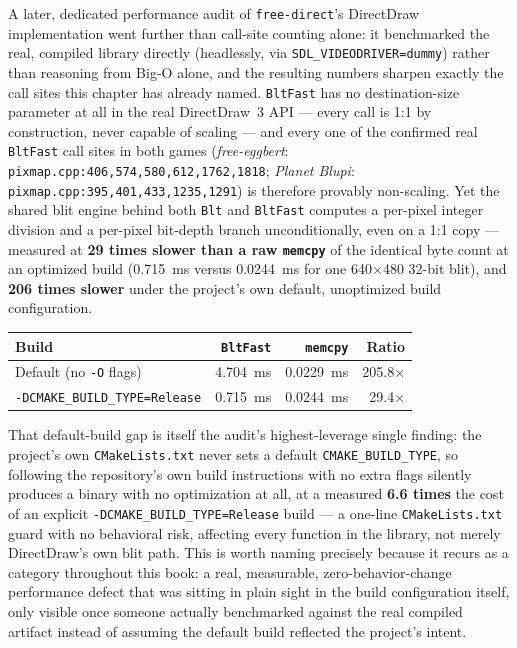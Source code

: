 A later, dedicated performance audit of \texttt{free-direct}'s DirectDraw implementation
went further than call-site counting alone: it benchmarked the real, compiled library
directly (headlessly, via \texttt{SDL\_VIDEODRIVER=dummy}) rather than reasoning from
Big-O alone, and the resulting numbers sharpen exactly the call sites this chapter has
already named. \texttt{BltFast} has no destination-size parameter at all in the real
DirectDraw~3 API --- every call is 1:1 by construction, never capable of scaling --- and
every one of the confirmed real \texttt{BltFast} call sites in both games
(\emph{free-eggbert}: \texttt{pixmap.cpp:406,574,580,612,1762,1818}; \emph{Planet Blupi}:
\texttt{pixmap.cpp:395,401,433,1235,1291}) is therefore provably non-scaling. Yet the
shared blit engine behind both \texttt{Blt} and \texttt{BltFast} computes a per-pixel
integer division and a per-pixel bit-depth branch unconditionally, even on a 1:1 copy ---
measured at \textbf{29 times slower than a raw \texttt{memcpy}} of the identical byte count
at an optimized build (0.715~ms versus 0.0244~ms for one 640$\times$480 32-bit blit), and
\textbf{206 times slower} under the project's own default, unoptimized build configuration.

\begin{center}
\small
\begin{tabular}{lrrr}
\toprule
\textbf{Build} & \textbf{\texttt{BltFast}} & \textbf{\texttt{memcpy}} & \textbf{Ratio} \\
\midrule
Default (no \texttt{-O} flags) & 4.704~ms & 0.0229~ms & 205.8$\times$ \\
\texttt{-DCMAKE\_BUILD\_TYPE=Release} & 0.715~ms & 0.0244~ms & 29.4$\times$ \\
\bottomrule
\end{tabular}
\end{center}

That default-build gap is itself the audit's highest-leverage single finding: the project's
own \texttt{CMakeLists.txt} never sets a default \texttt{CMAKE\_BUILD\_TYPE}, so following
the repository's own build instructions with no extra flags silently produces a binary with
no optimization at all, at a measured \textbf{6.6 times} the cost of an explicit
\texttt{-DCMAKE\_BUILD\_TYPE=Release} build --- a one-line \texttt{CMakeLists.txt} guard
with no behavioral risk, affecting every function in the library, not merely DirectDraw's
own blit path. This is worth naming precisely because it recurs as a category throughout
this book: a real, measurable, zero-behavior-change performance defect that was sitting in
plain sight in the build configuration itself, only visible once someone actually benchmarked
against the real compiled artifact instead of assuming the default build reflected the
project's intent.

